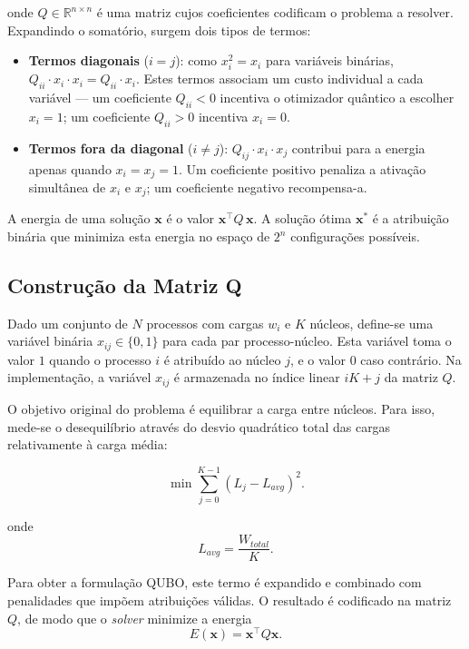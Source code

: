\documentclass[12pt,a4paper]{article}
\begin{document}
onde $Q \in \mathbb{R}^{n \times n}$ é uma matriz cujos coeficientes codificam o problema a resolver.
Expandindo o somatório, surgem dois tipos de termos:

\begin{itemize}
    \item \textbf{Termos diagonais} ($i = j$): como $x_i^2 = x_i$ para variáveis binárias,
    $Q_{ii} \cdot x_i \cdot x_i = Q_{ii} \cdot x_i$. Estes termos associam um custo individual
    a cada variável --- um coeficiente $Q_{ii} < 0$ incentiva o otimizador quântico a escolher $x_i = 1$; um coeficiente
    $Q_{ii} > 0$ incentiva $x_i = 0$.

    \item \textbf{Termos fora da diagonal} ($i \neq j$): $Q_{ij} \cdot x_i \cdot x_j$ contribui
    para a energia apenas quando $x_i = x_j = 1$. Um coeficiente positivo penaliza a ativação
    simultânea de $x_i$ e $x_j$; um coeficiente negativo recompensa-a.
\end{itemize}

A energia de uma solução $\mathbf{x}$ é o valor $\mathbf{x}^\top Q\, \mathbf{x}$.
A solução ótima $\mathbf{x}^*$ é a atribuição binária que minimiza esta energia no espaço de
$2^n$ configurações possíveis.

\subsection{Construção da Matriz Q}

Dado um conjunto de $N$ processos com cargas $w_i$ e $K$ núcleos, define-se uma
variável binária $x_{ij} \in \{0,1\}$ para cada par processo-núcleo. Esta variável
toma o valor $1$ quando o processo $i$ é atribuído ao núcleo $j$, e o valor $0$
caso contrário.
Na implementação, a variável $x_{ij}$ é armazenada no índice linear $iK+j$ da matriz $Q$.

O objetivo original do problema é equilibrar a carga entre núcleos. Para isso,
mede-se o desequilíbrio através do desvio quadrático total das cargas relativamente
à carga média:

\begin{equation}
    \min \sum_{j=0}^{K-1}(L_j - L_{avg})^2.
\end{equation}

onde
\begin{equation}
    L_{avg} = \frac{W_{total}}{K}.
\end{equation}

Para obter a formulação QUBO, este termo é expandido e combinado com penalidades que impõem
atribuições válidas. O resultado é codificado na matriz $Q$, de modo que o \textit{solver}
minimize a energia
\begin{equation}
    E(\mathbf{x}) = \mathbf{x}^{\top}Q\mathbf{x}.
\end{equation}
\end{document}
